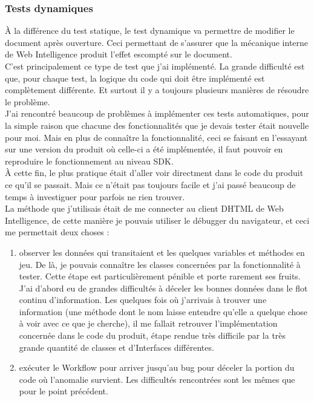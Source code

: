 \subsubsection{Tests dynamiques}

\`{A} la diff\'{e}rence du test statique, le test dynamique va permettre de modifier le document apr\`{e}s ouverture. Ceci permettant de s'assurer que la m\'{e}canique interne de Web Intelligence produit l'effet escompt\'{e} sur le document.\\
C'est principalement ce type de test que j'ai impl\'{e}ment\'{e}. La grande difficult\'{e} est que, pour chaque test, la logique du code qui doit \^{e}tre impl\'{e}ment\'{e} est compl\`{e}tement diff\'{e}rente. Et surtout il y a toujours plusieurs mani\`{e}res de r\'{e}soudre le probl\`{e}me.\\
J'ai rencontr\'{e} beaucoup de probl\`{e}mes \`{a} impl\'{e}menter ces tests automatiques, pour la simple raison que chacune des fonctionnalit\'{e}s que je devais tester \'{e}tait nouvelle pour moi. Mais en plus de conna\^{i}tre la fonctionnalit\'{e}, ceci se faisant en l'essayant sur une version du produit o\`{u} celle-ci a \'{e}t\'{e} impl\'{e}ment\'{e}e, il faut pouvoir en reproduire le fonctionnement au niveau SDK.\\
\`{A} cette fin, le plus pratique \'{e}tait d'aller voir directment dans le code du produit ce qu'il se passait. Mais ce n'\'{e}tait pas toujours facile et j'ai pass\'{e} beaucoup de temps \`{a} investiguer pour parfois ne rien trouver.\\
La m\'{e}thode que j'utilisais \'{e}tait de me connecter au client DHTML de Web Intelligence, de cette mani\`{e}re je pouvais utiliser le d\'{e}bugger du navigateur, et ceci me permettait deux choses :
\begin{enumerate}
	\item observer les donn\'{e}es qui transitaient et les quelques variables et m\'{e}thodes en jeu. De l\`{a}, je pouvais conna\^{i}tre les classes concern\'{e}es par la fonctionnalit\'{e} \`{a} tester. Cette \'{e}tape est particuli\`{e}rement p\'{e}nible et porte rarement ses fruits. J'ai d'abord eu de grandes difficult\'{e}s \`{a} d\'{e}celer les bonnes donn\'{e}es dans le flot continu d'information. Les quelques fois o\`{u} j'arrivais \`{a} trouver une information (une m\'{e}thode dont le nom laisse entendre qu'elle a quelque chose \`{a} voir avec ce que je cherche), il me fallait retrouver l'impl\'{e}mentation concern\'{e}e dans le code du produit, \'{e}tape rendue tr\`{e}s difficile par la tr\`{e}s grande quantit\'{e} de classes et d'\gls{Interface}s diff\'{e}rentes.
	\item ex\'{e}cuter le \gls{Workflow} pour arriver jusqu'au bug pour d\'{e}celer la portion du code o\`{u} l'anomalie survient. Les difficult\'{e}s rencontr\'{e}es sont les m\^{e}mes que pour le point pr\'{e}c\'{e}dent.
\end{enumerate}



